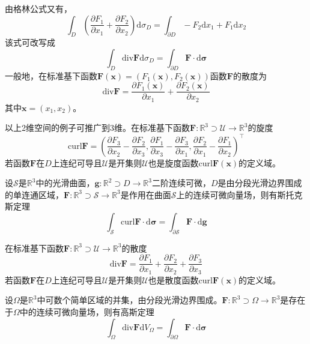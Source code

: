 \documentclass[../main.tex]{subfiles}
\begin{document}
由格林公式又有，
\[
    \int_D\left(\frac{\partial F_1}{\partial x_1}+\frac{\partial F_2}{\partial x_2}\right)\mathrm{d}\sigma_D=\int_{\partial D}-F_2\mathrm{d}x_1+F_1\mathrm{d}x_2
\]
该式可改写成
\[
    \int_D\mathrm{div}\mathbf{F}\mathrm{d}\sigma_D=\int_{\partial D}\mathbf{F}\cdot \mathrm{d}\symbf{\sigma}
\]
一般地，在标准基下函数$\mathbf{F}\left(\mathbf{x}\right)=\left(F_1\left(\mathbf{x}\right),F_2\left(\mathbf{x}\right)\right)$函数$\mathbf{F}$的散度为
\[
    \mathrm{div}\mathbf{F}=\frac{\partial F_1\left(\mathbf{x}\right)}{\partial x_1}+\frac{\partial F_2\left(\mathbf{x}\right)}{\partial x_2}
\]
其中$\mathbf{x}=\left(x_1,x_2\right)$。

以上2维空间的例子可推广到3维。在标准基下函数$\mathbf{F}:\mathbb{R}^3\supset \mathcal{U}\rightarrow\mathbb{R}^3$的旋度
\[
    \mathrm{curl}\mathbf{F}=\left(\frac{\partial F_3}{\partial x_2}-\frac{\partial F_2}{\partial x_3},\frac{\partial F_1}{\partial x_3}-\frac{\partial F_3}{\partial x_1},\frac{\partial F_2}{\partial x_1}-\frac{\partial F_1}{\partial x_2}\right)^\intercal
\]
若函数$\mathbf{F}$在$D$上连纪可导且$\mathcal{U}$是开集则$\mathcal{U}$也是旋度函数$\mathrm{curl}\mathbf{F}\left(\mathbf{x}\right)$的定义域。

设$\mathcal{S}$是$\mathbb{R}^3$中的光滑曲面，$\mathbf{g}:\mathbb{R}^2\supset D\rightarrow\mathbb{R}^3$二阶连续可微，$D$是由分段光滑边界围成的单连通区域，$\mathbf{F}:\mathbb{R}^3\supset\mathcal{S}\rightarrow\mathbb{R}^3$是作用在曲面$\mathcal{S}$上的连续可微向量场，则有斯托克斯定理
\[\int_{\mathcal{S}}\mathrm{curl}\mathbf{F}\cdot \mathrm{d}\symbf{\sigma}=\int_{\partial \mathcal{S}}\mathbf{F}\cdot \mathrm{d}\mathbf{g}
\]

在标准基下函数$\mathbf{F}:\mathbb{R}^3\supset \mathcal{U}\rightarrow\mathbb{R}^3$的散度
\[
    \mathrm{div}\mathbf{F}=\frac{\partial F_1}{\partial x_1}+\frac{\partial F_2}{\partial x_2}+\frac{\partial F_3}{\partial x_3}
\]
若函数$\mathbf{F}$在$D$上连纪可导且$\mathcal{U}$是开集则$\mathcal{U}$也是散度函数$\mathrm{curl}\mathbf{F}\left(\mathbf{x}\right)$的定义域。

设$\Omega$是$\mathbb{R}^3$中可数个简单区域的并集，由分段光滑边界围成。$\mathbf{F}:\mathbb{R}^3\supset\Omega\rightarrow\mathbb{R}^3$是存在于$\Omega$中的连续可微向量场，则有高斯定理
\[
    \int_\Omega\mathrm{div}\mathbf{F}\mathrm{d}V_\Omega=\int_{\partial \Omega}\mathbf{F}\cdot \mathrm{d}\symbf{\sigma}
\]
\end{document}
